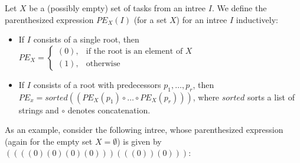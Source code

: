 \begin{definition}
  Let $X$ be a (possibly empty) set of tasks from an intree $I$.
  We define the parenthesized expression $PE_X(I)$ (for a set $X$) for an intree $I$ inductively:
  \begin{itemize}
  \item If $I$ consists of a single root, then 
    $
    PE_X =
    \begin{cases}
      (0), & \text{if the root is an element of } X \\
      (1), & \text{otherwise}
    \end{cases}
    $
  \item If $I$ consists of a root with predecessors $p_1,\dots,p_r$, then $PE_x = sorted(\left( PE_X(p_1) \circ \dots \circ PE_X(p_r) \right))$,
    where $sorted$ sorts a list of strings and $\circ$ denotes concatenation.
  \end{itemize}
\end{definition}

As an example, consider the following intree, whose parenthesized expression (again for the empty set $X=\emptyset$) is given by 
$
\left(  
  \left( 
    \left(
      \left( 0 \right)
      \left( 0 \right)
      \left( 0 \right)
      \left( 0 \right)
    \right)
  \right)
  \left( 
    \left( 
      \left( 0 \right)
    \right)
    \left( 0 \right)
  \right)
\right)
$:

\begin{center}
\end{center}

